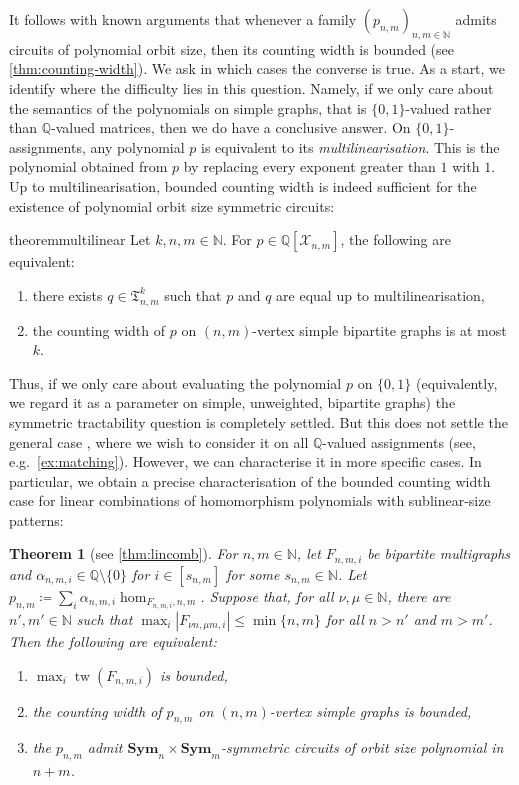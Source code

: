 \documentclass[10pt,a4paper]{article}
\theoremstyle{definition}
\theoremstyle{plain}
\newtheorem{theorem}[definition]{Theorem}
\theoremstyle{remark}
\DeclareMathOperator{\tw}{tw}
\newcommand{\Sym}{\mathbf{Sym}}
\newcommand{\bbQ}{\mathbb{Q}}
\begin{document}
It follows with known arguments that whenever a family $(p_{n,m})_{n,m\in \mathbb{N}}$ admits circuits of polynomial orbit size, then its counting width is bounded (see \cref{thm:counting-width}). We ask in which cases the converse is true. As a start, we identify where the difficulty lies in this question. Namely, if we only care about the semantics of the polynomials on simple graphs, that is $\{0,1\}$-valued rather than $\bbQ$-valued matrices, then we do have a conclusive answer. On $\{0,1\}$-assignments, any polynomial $p$ is equivalent to its \emph{multilinearisation}. This is the polynomial obtained from $p$ by replacing every exponent greater than $1$ with $1$. Up to multilinearisation, bounded counting width is indeed sufficient for the existence of polynomial orbit size symmetric circuits:
	
	\begin{restatable}{theorem}{multilinear}
		\label{thm:multilinear}
		Let $k,n,m \in \mathbb{N}$.
		For $p \in \mathbb{Q}[\mathcal{X}_{n,m}]$, the following are equivalent:
		\begin{enumerate}
			\item there exists $q \in \mathfrak{T}^k_{n,m}$ such that $p$ and $q$ are equal up to multilinearisation,
			\item the counting width of $p$ on $(n,m)$-vertex simple bipartite graphs is at most $k$.
		\end{enumerate}
	\end{restatable}
	
Thus, if we only care about evaluating the polynomial $p$ on
$\{0,1\}$ (equivalently, we regard it as a parameter on simple,
unweighted, bipartite graphs) the symmetric tractability question is
completely settled.  But this does not settle the general case , where we wish to
consider it on all $\bbQ$-valued assignments (see,
e.g.~\cref{ex:matching}).  However, we can characterise it in more
specific cases.  In particular, 
we obtain a precise characterisation of the bounded counting width case for linear combinations of homomorphism polynomials with sublinear-size patterns:

\begin{theorem}[see \cref{thm:lincomb}]\label{thm:lincomb-intro} 
	For $n,m \in \mathbb{N}$, 
	let $F_{n,m,i}$ be bipartite multigraphs and $\alpha_{n,m,i}
        \in \mathbb{Q} \setminus \{0\}$ for $i \in [s_{n,m}]$ for some
        $s_{n,m} \in \mathbb{N}$. 
	Let $p_{n,m} \coloneqq \sum_i \alpha_{n,m,i} \hom_{F_{n,m,i}, n,m}$.
	Suppose that, for all $\nu, \mu \in \mathbb{N}$,
	there are $n', m' \in \mathbb{N}$ 
	such that $\max_i |F_{\nu n, \mu m,i}| \leq \min \{n,m\}$ for all $n > n'$ and $m > m'$.		
	Then the following are equivalent:
	\begin{enumerate}
		\item $\max_i \tw(F_{n,m,i})$ is bounded,
		\item the counting width of $p_{n,m}$ on $(n,m)$-vertex simple graphs is bounded,
		\item the $p_{n,m}$ admit $\Sym_n\times \Sym_m$-symmetric circuits of orbit size polynomial in $n+m$.
	\end{enumerate}
\end{theorem}
\end{document}
